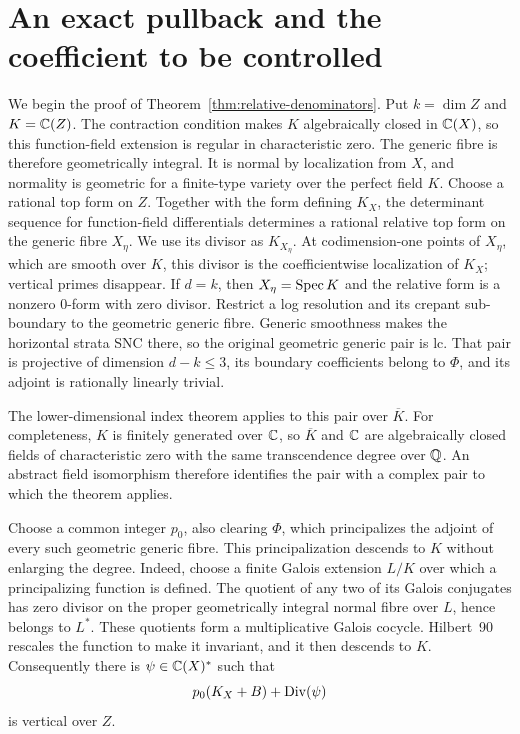 \section{An exact pullback and the coefficient to be controlled}
\label{sec:generic}

We begin the proof of Theorem~\ref{thm:relative-denominators}.  Put
$k=\dim Z$ and $K=\mathbb C(Z)$.  The contraction condition makes $K$
algebraically closed in $\mathbb C(X)$, so this function-field extension is
regular in characteristic zero.  The generic fibre is therefore
geometrically integral.  It is normal by localization from $X$, and
normality is geometric for a finite-type variety over the perfect field
$K$.  Choose a rational top form on $Z$.  Together with the form defining
$K_X$, the determinant sequence for function-field differentials determines
a rational relative top form on the generic fibre $X_\eta$.  We use its
divisor as $K_{X_\eta}$.  At codimension-one points of $X_\eta$, which are
smooth over $K$, this divisor is the coefficientwise localization of
$K_X$; vertical primes disappear.  If $d=k$, then $X_\eta=\operatorname{Spec} K$ and
the relative form is a nonzero $0$-form with zero divisor.
Restrict a log resolution and its crepant sub-boundary to the
geometric generic fibre.  Generic smoothness makes the horizontal strata
SNC there, so the original geometric generic pair is lc.  That pair is
projective of dimension $d-k\leq3$, its boundary coefficients belong to
$\Phi$, and its adjoint is rationally linearly trivial.

The lower-dimensional index theorem applies to this pair over
$\overline K$.  For completeness, $K$ is finitely generated over $\mathbb C$,
so $\overline K$ and $\mathbb C$ are algebraically closed fields of
characteristic zero with the same transcendence degree over $\mathbb Q$.
An abstract field isomorphism therefore identifies the pair with a
complex pair to which the theorem applies.

Choose a common integer $p_0$, also clearing $\Phi$, which principalizes
the adjoint of every such geometric generic fibre.  This
principalization descends to $K$ without enlarging the degree.  Indeed,
choose a finite Galois extension $L/K$ over which a principalizing
function is defined.  The quotient of any two of its Galois conjugates
has zero divisor on the proper geometrically integral normal fibre over
$L$, hence belongs to $L^*$.  These quotients form a multiplicative
Galois cocycle.  Hilbert~90 rescales the function to make it invariant,
and it then descends to $K$.  Consequently there is
$\psi\in\mathbb C(X)^*$ such that
\[
 p_0(K_X+B)+\operatorname{Div}(\psi)
\]
is vertical over $Z$.

